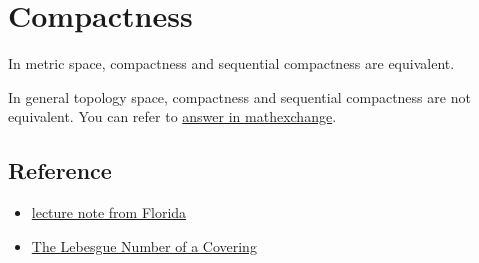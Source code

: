 \chapter{Compactness}\label{chp:compactness}

\begin{theorem}{}{}
    In metric space, compactness and sequential compactness are equivalent.
\end{theorem}




\begin{remark}
    In general topology space, compactness and sequential compactness are not equivalent. You can refer to 
\href{https://math.stackexchange.com/questions/152447/compactness-sequentially-compact}{answer in mathexchange}.
\end{remark}



\section{Reference}

\begin{itemize}
    \item \href{https://people.clas.ufl.edu/mjury/files/sequential_compactness_notes.pdf}{lecture note from Florida}
    \item \href{https://www.umsl.edu/~siegelj/SetTheoryandTopology/Compact2.html}{The Lebesgue Number of a Covering}
\end{itemize}